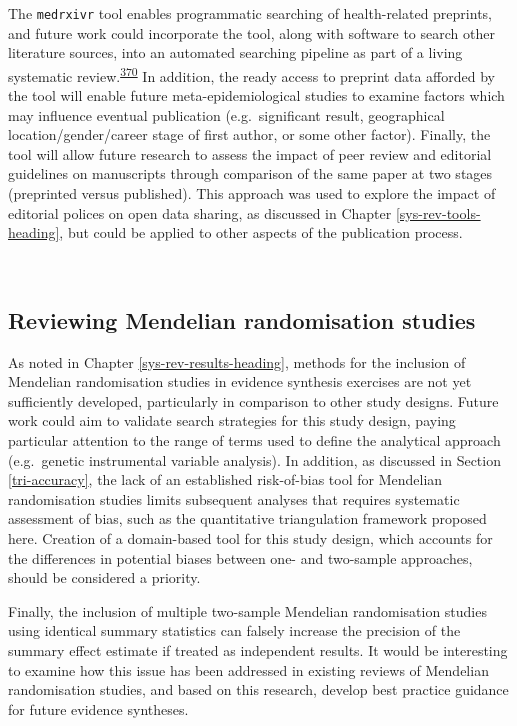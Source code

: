 \documentclass[a4paper, twoside]{templates/ociamthesis}
\begin{document}
The \texttt{medrxivr} tool enables programmatic searching of health-related preprints, and future work could incorporate the tool, along with software to search other literature sources, into an automated searching pipeline as part of a living systematic review.\textsuperscript{\protect\hyperlink{ref-elliott2014}{370}} In addition, the ready access to preprint data afforded by the tool will enable future meta-epidemiological studies to examine factors which may influence eventual publication (e.g.~significant result, geographical location/gender/career stage of first author, or some other factor). Finally, the tool will allow future research to assess the impact of peer review and editorial guidelines on manuscripts through comparison of the same paper at two stages (preprinted versus published). This approach was used to explore the impact of editorial polices on open data sharing, as discussed in Chapter \ref{sys-rev-tools-heading}, but could be applied to other aspects of the publication process.

~

\hypertarget{reviewing-mendelian-randomisation-studies}{%
\subsection{Reviewing Mendelian randomisation studies}\label{reviewing-mendelian-randomisation-studies}}

As noted in Chapter \ref{sys-rev-results-heading}, methods for the inclusion of Mendelian randomisation studies in evidence synthesis exercises are not yet sufficiently developed, particularly in comparison to other study designs. Future work could aim to validate search strategies for this study design, paying particular attention to the range of terms used to define the analytical approach (e.g.~genetic instrumental variable analysis). In addition, as discussed in Section \ref{tri-accuracy}, the lack of an established risk-of-bias tool for Mendelian randomisation studies limits subsequent analyses that requires systematic assessment of bias, such as the quantitative triangulation framework proposed here. Creation of a domain-based tool for this study design, which accounts for the differences in potential biases between one- and two-sample approaches, should be considered a priority.

Finally, the inclusion of multiple two-sample Mendelian randomisation studies using identical summary statistics can falsely increase the precision of the summary effect estimate if treated as independent results. It would be interesting to examine how this issue has been addressed in existing reviews of Mendelian randomisation studies, and based on this research, develop best practice guidance for future evidence syntheses.
\end{document}
